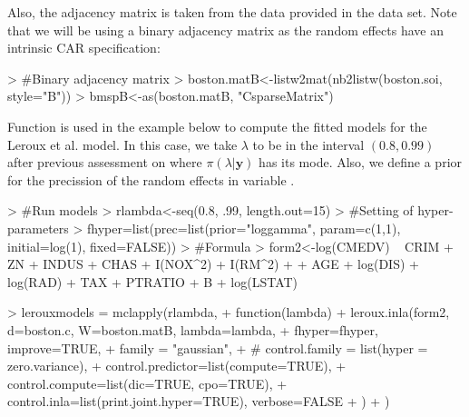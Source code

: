 \documentclass[article]{jss}
\begin{document}


Also, the adjacency matrix is taken from the data provided in the 
data set.
Note that we will be using a binary adjacency matrix as the random
effects have an intrinsic CAR specification:
\begin{Schunk}
\begin{Sinput}
> #Binary adjacency matrix
> boston.matB<-listw2mat(nb2listw(boston.soi, style="B"))
> bmspB<-as(boston.matB, "CsparseMatrix")
\end{Sinput}
\end{Schunk}

Function  is used in the example below to compute the fitted
models for the Leroux et al. model.  In this case, we take $\lambda$ to be in
the interval $(0.8,0.99)$ after previous assessment on where
$\pi(\lambda|\mathbf{y})$ has its mode. Also, we define a prior for the
precission of the random effects in variable .

\begin{Schunk}
\begin{Sinput}
> #Run models
> rlambda<-seq(0.8, .99, length.out=15)
> #Setting of hyper-parameters
> fhyper=list(prec=list(prior="loggamma", param=c(1,1), initial=log(1), fixed=FALSE))
> #Formula
> form2<-log(CMEDV) ~ CRIM + ZN + INDUS + CHAS + I(NOX^2) + I(RM^2) + 
+     AGE + log(DIS) + log(RAD) + TAX + PTRATIO + B + log(LSTAT)
\end{Sinput}
\end{Schunk}

\begin{Schunk}
\begin{Sinput}
> lerouxmodels = mclapply(rlambda,
+         function(lambda) {
+                 leroux.inla(form2, d=boston.c, W=boston.matB, lambda=lambda,
+                         fhyper=fhyper, improve=TRUE,
+                         family = "gaussian",
+ #   control.family = list(hyper = zero.variance),
+                         control.predictor=list(compute=TRUE),
+                         control.compute=list(dic=TRUE, cpo=TRUE),
+                         control.inla=list(print.joint.hyper=TRUE), verbose=FALSE
+                 )
+         })
\end{Sinput}
\end{Schunk}
\end{document}
